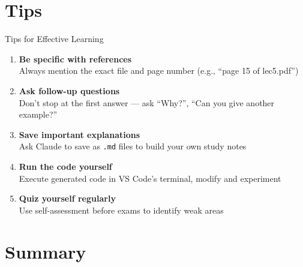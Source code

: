 \documentclass[aspectratio=169,xcolor=dvipsnames]{beamer}
\begin{document}
\section{Tips}

\begin{frame}{Tips for Effective Learning}
  \begin{enumerate}
    \item \textbf{Be specific with references}\\
      {\small Always mention the exact file and page number (e.g., ``page 15 of lec5.pdf'')}

    \vspace{0.5em}
    \item \textbf{Ask follow-up questions}\\
      {\small Don't stop at the first answer --- ask ``Why?'', ``Can you give another example?''}

    \vspace{0.5em}
    \item \textbf{Save important explanations}\\
      {\small Ask Claude to save as \texttt{.md} files to build your own study notes}

    \vspace{0.5em}
    \item \textbf{Run the code yourself}\\
      {\small Execute generated code in VS Code's terminal, modify and experiment}

    \vspace{0.5em}
    \item \textbf{Quiz yourself regularly}\\
      {\small Use self-assessment before exams to identify weak areas}
  \end{enumerate}
\end{frame}

\section{Summary}
\end{document}
